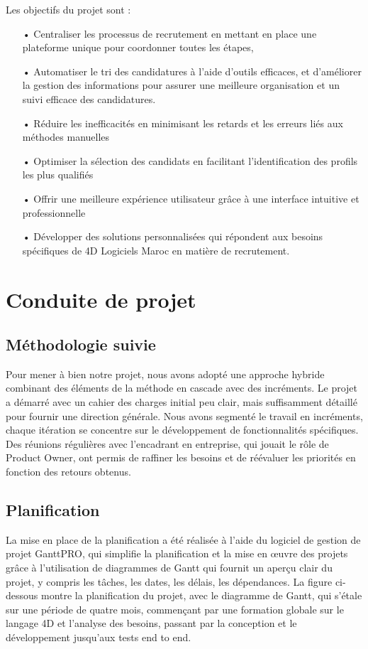 Les objectifs du projet sont :
\begin{itemize}
    \item[•]  Centraliser les processus 
    de recrutement en mettant en place une plateforme unique pour 
    coordonner toutes les étapes, 
    \item[•] Automatiser le tri des candidatures à l'aide d'outils efficaces, 
    et d'améliorer la gestion des informations pour assurer une 
    meilleure organisation et un suivi efficace des candidatures. 
    \item[•] Réduire les inefficacités en minimisant 
    les retards et les erreurs liés aux méthodes manuelles
    \item[•] Optimiser la sélection des candidats en facilitant 
    l'identification des profils les plus qualifiés
    \item[•] Offrir une 
    meilleure expérience utilisateur grâce à une interface intuitive 
    et professionnelle
    \item[•] Développer des solutions 
    personnalisées qui répondent aux besoins spécifiques de 4D 
    Logiciels Maroc en matière de recrutement.
\end{itemize}


\section{Conduite de projet}
\subsection{Méthodologie suivie}
Pour mener à bien notre projet, nous avons adopté une approche hybride 
combinant des éléments de la méthode en cascade avec des incréments. 
Le projet a démarré avec un cahier des charges initial peu clair, 
mais suffisamment détaillé pour fournir une direction générale. 
Nous avons segmenté le travail en incréments, chaque itération se 
concentre sur le développement de fonctionnalités spécifiques. 
Des réunions régulières avec l'encadrant en entreprise, qui jouait le rôle de 
Product Owner, ont permis de raffiner les besoins et de réévaluer 
les priorités en fonction des retours obtenus.

\subsection{Planification}
La mise en place de la planification a été réalisée à l’aide du logiciel de gestion de
projet GanttPRO, qui simplifie la planification et la mise en œuvre des projets grâce à
l’utilisation de diagrammes de Gantt qui fournit un aperçu clair du projet, y compris les
tâches, les dates, les délais, les dépendances.
La figure ci-dessous montre la planification du projet, avec le diagramme de Gantt,
qui s’étale sur une période de quatre mois, commençant par une formation globale sur
le langage 4D et l’analyse des besoins, passant par la conception et le développement
jusqu’aux tests end to end.

